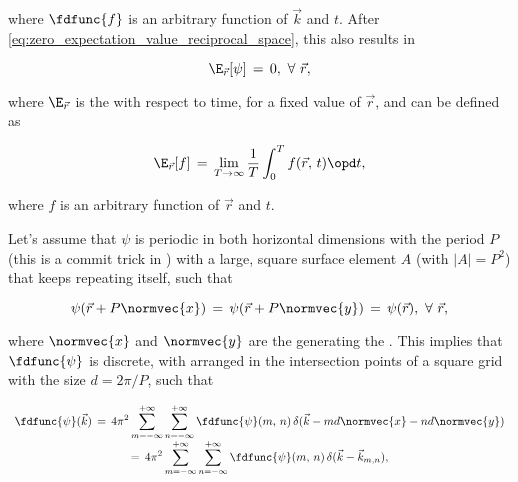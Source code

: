 where $\fdfunc{f}$ is an arbitrary function of $\vec{k}$ and $t$. After  \eqref{eq:zero_expectation_value_reciprocal_space}, this also results in 

\begin{equation} \label{eq:zero_expectation_value_real_space_with_regard_to_t}
\E_{\vec{r}}[\psi] \,=\, 0,\ \forall\ \vec{r},
\end{equation}

where $\E_{\vec{r}}$ is the  with respect to time, for a fixed value of $\vec{r}$, and can be defined as

\begin{equation} \label{eq:expectation_value_real_space_with_regard_to_t_definition}
\E_{\vec{r}}[f] \,=\, \lim_{T\to\infty}\frac{1}{T}\int_0^T f(\vec{r},\,t)\opd t,
\end{equation}

where $f$ is an arbitrary function of $\vec{r}$ and $t$.

Let's assume that $\psi$ is periodic in both horizontal dimensions with the period $P$ (this is a commit trick in ) with a large, square surface element $A$ (with \mbox{$|A| = P^2$}) that keeps repeating itself, such that

\begin{equation} \label{eq:water_surface_periodicity}
\psi(\vec{r}+P\normvec{x}) \,=\, \psi(\vec{r}+P\normvec{y}) \,=\, \psi(\vec{r}),\ \forall\ \vec{r},
\end{equation}

where $\normvec{x}$ and $\normvec{y}$ are the  generating the . This implies that $\fdfunc{\psi}$ is discrete, with  arranged in the intersection points of a square grid with the size $d = 2\pi/P$, such that

\begin{equation} \label{eq:fd_eta_series}
\renewcommand*{\arraystretch}{2}
\begin{array}{c}
\displaystyle \fdfunc{\psi}(\vec{k}) \,=\, 4\pi^2\sum_{m=-\infty}^{+\infty}\sum_{n=-\infty}^{+\infty} \fdfunc{\psi}(m,\,n)\,\delta(\vec{k} - md\normvec{x} - nd\normvec{y}) \\
\displaystyle =\, 4\pi^2\sum_{m=-\infty}^{+\infty}\sum_{n=-\infty}^{+\infty} \fdfunc{\psi}(m,\,n)\,\delta(\vec{k} - \vec{k}_{m,n}),
\end{array}
\end{equation}

